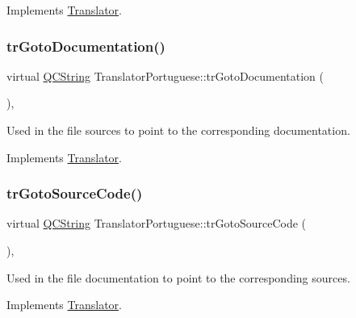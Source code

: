 Implements \mbox{\hyperlink{class_translator}{Translator}}.

\mbox{\label{class_translator_portuguese_a4a080b1b7f549db556044b03abaf6015}} 
\subsubsection{\texorpdfstring{trGotoDocumentation()}{trGotoDocumentation()}}
{\footnotesize\ttfamily virtual \mbox{\hyperlink{class_q_c_string}{Q\+C\+String}} Translator\+Portuguese\+::tr\+Goto\+Documentation (\begin{DoxyParamCaption}{ }\end{DoxyParamCaption})\hspace{0.3cm}{\ttfamily [inline]}, {\ttfamily [virtual]}}

Used in the file sources to point to the corresponding documentation. 

Implements \mbox{\hyperlink{class_translator}{Translator}}.

\mbox{\label{class_translator_portuguese_aee5a037f1d16cfb8040339866c4b5150}} 
\subsubsection{\texorpdfstring{trGotoSourceCode()}{trGotoSourceCode()}}
{\footnotesize\ttfamily virtual \mbox{\hyperlink{class_q_c_string}{Q\+C\+String}} Translator\+Portuguese\+::tr\+Goto\+Source\+Code (\begin{DoxyParamCaption}{ }\end{DoxyParamCaption})\hspace{0.3cm}{\ttfamily [inline]}, {\ttfamily [virtual]}}

Used in the file documentation to point to the corresponding sources. 

Implements \mbox{\hyperlink{class_translator}{Translator}}.

\mbox{\label{class_translator_portuguese_ae0a58191f357edad54d3f37cf9626455}} 
